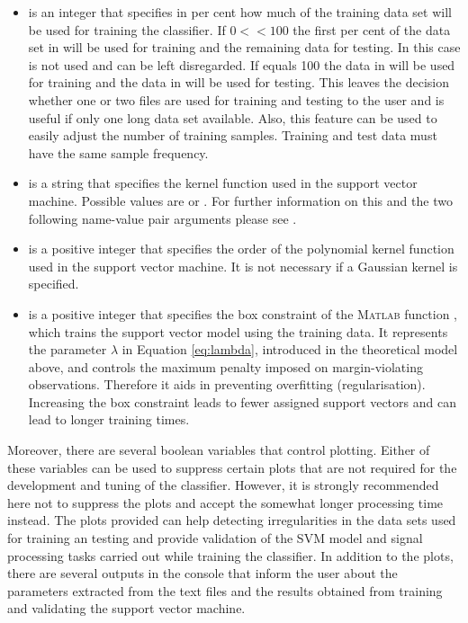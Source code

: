 \begin{enumerate}
\begin{itemize}
\item {} is an integer that specifies in per cent how much of the training data set will be used for training the classifier. If $0 < $$ < 100$ the first  per cent of the data set in  will be used for training and the remaining data for testing. In this case   is not used and can be left disregarded. If  equals 100 the data in  will be used for training and the data in  will be used for testing. This leaves the decision whether one or two files are used for training and testing to the user and is useful if only one long data set available. Also, this feature can be used to easily adjust the number of training samples. Training and test data must have the same sample frequency.

\item {} is a string that specifies the kernel function used in the support vector machine. Possible values are  or . For further information on this and the two following name-value pair arguments please see \cite{fitcsvm}.

\item {} is a positive integer that specifies the order of the polynomial kernel function used in the support vector machine. It is not necessary if a Gaussian kernel is specified.

\item {} is a positive integer that specifies the box constraint of the \textsc{Matlab}\textsuperscript{\textregistered} function , which trains the support vector model using the training data. It represents the parameter $\lambda$ in Equation \ref{eq:lambda}, introduced in the theoretical model above, and controls the maximum penalty imposed on margin-violating observations. Therefore it aids in preventing overfitting (regularisation). Increasing the box constraint leads to fewer assigned support vectors and can lead to longer training times.

\end{itemize}

Moreover, there are several boolean variables that control plotting. Either of these variables can be used to suppress certain plots that are not required for the development and tuning of the classifier. However, it is strongly recommended here not to suppress the plots and accept the somewhat longer processing time instead. The plots provided can help detecting irregularities in the data sets used for training an testing and provide validation of the SVM model and signal processing tasks carried out while training the classifier. In addition to the plots, there are several outputs in the console that inform the user about the parameters extracted from the text files and the results obtained from training and validating the support vector machine.

\end{enumerate}

